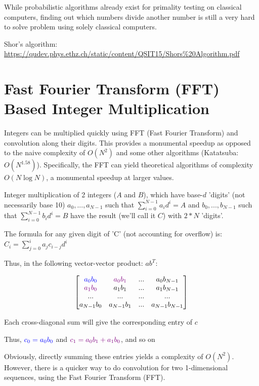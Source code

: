 \documentclass[a4paper,11pt]{article}
\theoremstyle{mytheor}
\begin{document}
While probabilistic algorithms already exist for primality testing on classical computers, finding out which numbers divide another number is still a very hard to solve problem using solely classical computers.

Shor's algorithm: \href{https://qudev.phys.ethz.ch/static/content/QSIT15/Shors\%20Algorithm.pdf}{https://qudev.phys.ethz.ch/static/content/QSIT15/Shors\%20Algorithm.pdf}



\section{Fast Fourier Transform (FFT) Based Integer Multiplication}\label{sec:mult}

Integers can be multiplied quickly using FFT (Fast Fourier Transform) and convolution along their digits. This provides a monumental speedup as opposed to the naive complexity of $O(N^2)$ and some other algorithms (Katatsuba: $O(N^{1.58})$). Specifically, the FFT can yield theoretical algorithms of complexity $O(N \log N)$, a monumental speedup at larger values.

Integer multiplication of 2 integers ($A$ and $B$), which have base-$d$ 'digits' (not necessarily base 10) $a_0, ..., a_{N-1}$ such that $\sum_{i=0}^{N-1} a_i d^i = A$ and $b_0, ..., b_{N-1}$ such that $\sum_{i=0}^{N-1} b_i d^i = B$ have the result (we'll call it $C$) with $2*N$ 'digits'.

The formula for any given digit of 'C' (not accounting for overflow) is: $C_i=\sum_{j=0}^{i} a_{j}c_{i-j}d^{i}$

Thus, in the following vector-vector product: $ab^T$:
\newcommand\GREEN{\color{violet}}
\newcommand\BLUE{\color{blue}}

$$ \begin{bmatrix}
\BLUE a_0 b_0 & \GREEN a_0 b_1 & ... & a_0 b_{N-1} \\
\GREEN a_1 b_0 & a_1 b_1 & ... & a_1 b_{N-1} \\
... & ... & ... & ... \\
a_{N-1} b_0 & a_{N-1} b_1 & ... & a_{N-1} b_{N-1} \\
\end{bmatrix} $$


Each cross-diagonal sum will give the corresponding entry of $c$

Thus, $\BLUE c_0 = a_0 b_0$ and $\GREEN c_1 = a_0 b_1 + a_1 b_0$, and so on

Obviously, directly summing these entries yields a complexity of $O(N^2)$. However, there is a quicker way to do convolution for two 1-dimensional sequences, using the Fast Fourier Transform (FFT).
\end{document}
